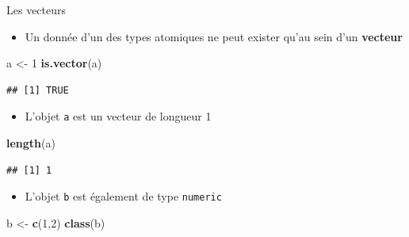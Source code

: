\documentclass[
  ignorenonframetext,
]{beamer}
\newenvironment{Shaded}{\begin{snugshade}}{\end{snugshade}}
\newcommand{\DecValTok}[1]{\textcolor[rgb]{0.00,0.00,0.81}{#1}}
\newcommand{\FunctionTok}[1]{\textcolor[rgb]{0.13,0.29,0.53}{\textbf{#1}}}
\newcommand{\NormalTok}[1]{#1}
\newcommand{\OtherTok}[1]{\textcolor[rgb]{0.56,0.35,0.01}{#1}}
\providecommand{\tightlist}{%
  \setlength{\itemsep}{0pt}\setlength{\parskip}{0pt}}
\begin{document}
\begin{frame}[fragile]{Les vecteurs}
\protect\hypertarget{les-vecteurs}{}
\begin{itemize}
\tightlist
\item
  Un donnée d'un des types atomiques ne peut exister qu'au sein d'un
  \textbf{vecteur}
\end{itemize}

\tiny

\begin{Shaded}
\begin{Highlighting}[]
\NormalTok{a }\OtherTok{\textless{}{-}} \DecValTok{1}
\FunctionTok{is.vector}\NormalTok{(a)}
\end{Highlighting}
\end{Shaded}

\begin{verbatim}
## [1] TRUE
\end{verbatim}

\normalsize

\begin{itemize}
\tightlist
\item
  L'objet \texttt{a} est un vecteur de longueur 1
\end{itemize}

\tiny

\begin{Shaded}
\begin{Highlighting}[]
\FunctionTok{length}\NormalTok{(a)}
\end{Highlighting}
\end{Shaded}

\begin{verbatim}
## [1] 1
\end{verbatim}

\normalsize

\begin{itemize}
\tightlist
\item
  L'objet \texttt{b} est également de type \texttt{numeric}
\end{itemize}

\tiny

\begin{Shaded}
\begin{Highlighting}[]
\NormalTok{b }\OtherTok{\textless{}{-}} \FunctionTok{c}\NormalTok{(}\DecValTok{1}\NormalTok{,}\DecValTok{2}\NormalTok{)}
\FunctionTok{class}\NormalTok{(b)}
\end{Highlighting}
\end{Shaded}


\end{frame}
\end{document}
